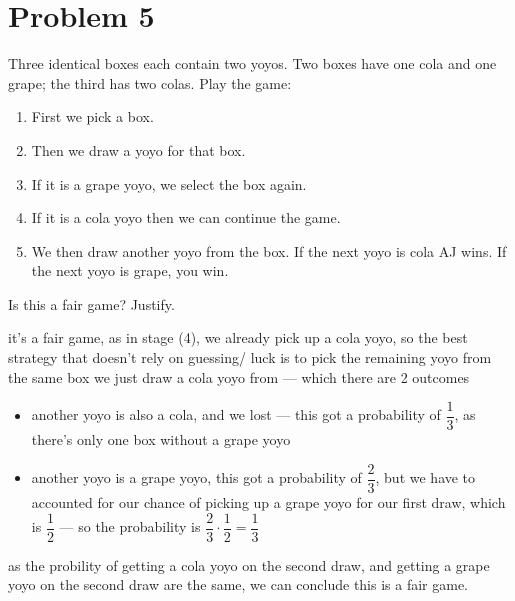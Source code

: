 \vspace{1em}
\hrulefill

\section*{Problem 5}
Three identical boxes each contain two yoyos. Two boxes have one cola and one grape; the third has two colas. Play the game:
\begin{enumerate}[label=\arabic*.]
    \item First we pick a box.
    \item Then we draw a yoyo for that box.
    \item If it is a grape yoyo, we select the box again.
    \item If it is a cola yoyo then we can continue the game.
    \item We then draw another yoyo from the box. If the next yoyo is cola AJ wins. If the next yoyo is grape, you win.
\end{enumerate}
Is this a fair game? Justify.

\medskip
\solution

it's a fair game, as in stage (4), we already pick up a cola yoyo, so the best strategy that doesn't rely on guessing/ luck is to pick the remaining yoyo from the same box we just draw a cola yoyo from --- which there are 2 outcomes 

\begin{itemize}
    \item another yoyo is also a cola, and we lost --- this got a probability of $\dfrac{1}{3}$, as there's only one box without a grape yoyo
    \item another yoyo is a grape yoyo, this got a probability of $\dfrac{2}{3}$, but we have to accounted for our chance of picking up a grape yoyo for our first draw, which is $\dfrac{1}{2}$ --- so the probability is $\dfrac{2}{3} \cdot \dfrac{1}{2} = \dfrac{1}{3}$
\end{itemize}

as the probility of getting a cola yoyo on the second draw, and getting a grape yoyo on the second draw are the same, we can conclude this is a fair game.

\vspace{1em}
\hrulefill

